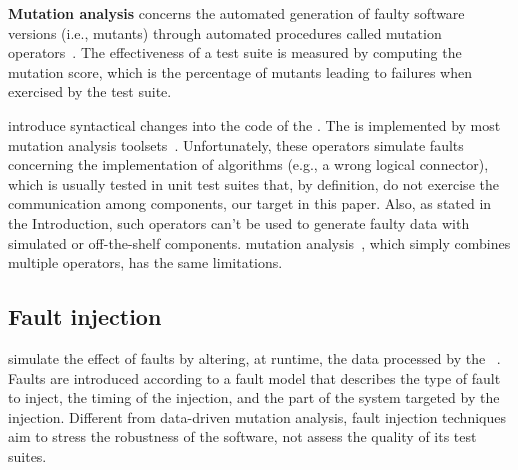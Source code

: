 \textbf{Mutation analysis} concerns the automated generation of faulty software versions (i.e., mutants) through automated procedures called mutation operators~\cite{jia2010analysis,papadakis2019mutation}. The effectiveness of a test suite is measured by computing the mutation score, which is the percentage of mutants leading to failures when exercised by the test suite.

 introduce syntactical changes into the code of the . The   is implemented by most mutation analysis toolsets~\cite{offutt1996experimental,rothermel1996experimental,andrews2005mutation,kintis2017detecting,offutt1996experimental}. 
Unfortunately, these operators simulate faults concerning the implementation of algorithms (e.g., a wrong logical connector), which is usually tested in unit test suites that, by definition, do not exercise the communication among components, our target in this paper. 
Also, as stated in the Introduction, such operators can't be used to generate faulty data with simulated or off-the-shelf components.
 mutation analysis~\cite{harman2010manifesto}, which simply combines multiple operators, has the same limitations.




\subsection{Fault injection}

 simulate the effect of faults by altering, at runtime, the data processed by the ~\cite{natella2016assessing}. Faults are introduced according to a fault model that describes the type of fault to inject, the timing of the injection, and the part of the system targeted by the injection. Different from data-driven mutation analysis, fault injection techniques aim to stress the robustness of the software,  
not assess the quality of its test suites.



